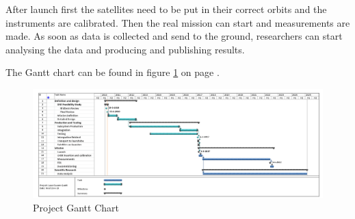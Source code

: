 After launch first the satellites need to be put in their correct orbits and the instruments are calibrated. Then the real mission can start and measurements are made. As soon as data is collected and send to the ground, researchers can start analysing the data and producing and publishing results. 

The Gantt chart can be found in figure \ref{ganttchart} on page \pageref{ganttchart}.

\begin{figure}
\centering
\includegraphics[width=1.3\textwidth, angle=90, bb=0 0 1606px 604px]{chapters/img/projectganttchart.png}
\caption{Project Gantt Chart}
\label{ganttchart}
\end{figure}